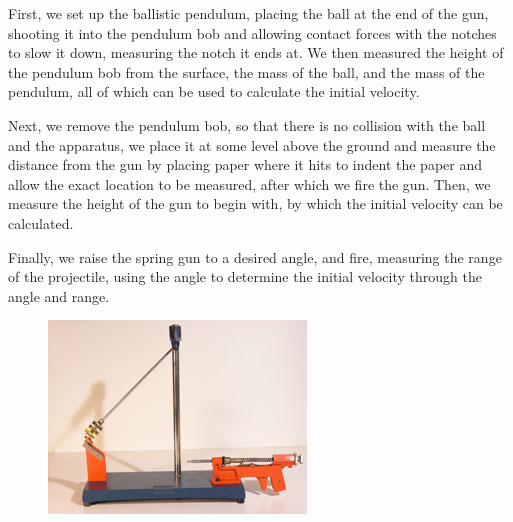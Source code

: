 \documentclass[11pt, titlepage]{article}
\begin{document}
First, we set up the ballistic pendulum, placing the ball at the end of the gun, shooting it into the pendulum bob and allowing contact forces with the notches to slow it down, measuring the notch it ends at. We then measured the height of the pendulum bob from the surface, the mass of the ball, and the mass of the pendulum, all of which can be used to calculate the initial velocity.

Next, we remove the pendulum bob, so that there is no collision with the ball and the apparatus, we place it at some level above the ground and measure the distance from the gun by placing paper where it hits to indent the paper and allow the exact location to be measured, after which we fire the gun. Then, we measure the height of the gun to begin with, by which the initial velocity can be calculated.

Finally, we raise the spring gun to a desired angle, and fire, measuring the range of the projectile, using the angle to determine the initial velocity through the angle and range. 

\begin{figure}[p]
\centering
\hspace*{-8cm}
\includegraphics[scale=2]{lab2.jpg}
\vspace*{1cm}
\end{figure}
\end{document}
